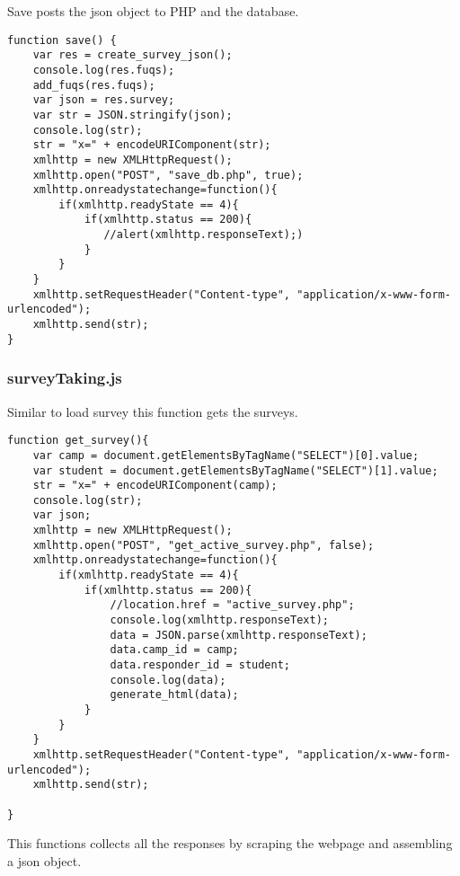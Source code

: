 \documentclass[../final.tex]{subfiles}
\begin{document}
Save posts the json object to PHP and the database. \\
\begin{lstlisting}
function save() {
	var res = create_survey_json();
	console.log(res.fuqs);
	add_fuqs(res.fuqs);
	var json = res.survey;
	var str = JSON.stringify(json);
	console.log(str);
	str = "x=" + encodeURIComponent(str);
	xmlhttp = new XMLHttpRequest();
	xmlhttp.open("POST", "save_db.php", true);
	xmlhttp.onreadystatechange=function(){
		if(xmlhttp.readyState == 4){
			if(xmlhttp.status == 200){
			   //alert(xmlhttp.responseText);)
			}	
		}	
	}
	xmlhttp.setRequestHeader("Content-type", "application/x-www-form-urlencoded");
	xmlhttp.send(str);
}

\end{lstlisting}
\subsubsection{surveyTaking.js}
Similar to load survey this function gets the surveys.
\begin{lstlisting}
function get_survey(){
	var camp = document.getElementsByTagName("SELECT")[0].value;
	var student = document.getElementsByTagName("SELECT")[1].value;
	str = "x=" + encodeURIComponent(camp);
	console.log(str);
	var json;
	xmlhttp = new XMLHttpRequest();
	xmlhttp.open("POST", "get_active_survey.php", false);
	xmlhttp.onreadystatechange=function(){
		if(xmlhttp.readyState == 4){
			if(xmlhttp.status == 200){
				//location.href = "active_survey.php";
				console.log(xmlhttp.responseText);
				data = JSON.parse(xmlhttp.responseText);
				data.camp_id = camp;
				data.responder_id = student;
				console.log(data);
				generate_html(data);
			}
		}	
	}
	xmlhttp.setRequestHeader("Content-type", "application/x-www-form-urlencoded");
	xmlhttp.send(str);
	
}

\end{lstlisting}
This functions collects all the responses by scraping the 
webpage and assembling a json object. 
\end{document}
